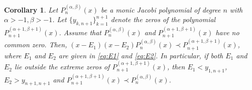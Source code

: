 \documentclass[final,3p,times,12pt]{elsarticle}
\newtheorem{corollary}{Corollary}[section]
\numberwithin{equation}{section}  %
\begin{document}
	\begin{corollary}\label{Interlace-Jacobi-both-shifted-degree-parameter}
		Let $P^{(\alpha, \beta)}_n(x)$ be a monic Jacobi  polynomial of degree $n$ with $\alpha>-1,\beta>-1$. Let  $\{y_{k,n+1}\}_{k=1}^{n+1}$ denote the zeros of the polynomial  $P^{(\alpha+1, \beta+1)}_{n+1}(x)$. Assume that $P^{(\alpha, \beta)}_n(x)$ and $P^{(\alpha+1, \beta+1)}_{n+1}(x)$ have no common zero. Then,  $(x - E_1)(x - E_2) P^{(\alpha, \beta)}_n(x)\prec P^{(\alpha+1, \beta+1)}_{n+1}(x)$, where $E_1$ and $E_2$ are given in \eqref{eq:E1} and \eqref{eq:E2}. In particular, if both $E_1$ and $E_2$ lie outside the extreme zeros of $P^{(\alpha+1, \beta+1)}_{n+1}(x)$, then $E_1 < y_{1,n+1}$, $E_2 > y_{n+1,n+1}$ and  $P^{(\alpha+1, \beta+1)}_{n+1}(x) \prec P^{(\alpha, \beta)}_{n}(x)$.
	\end{corollary}
	
\end{document}
